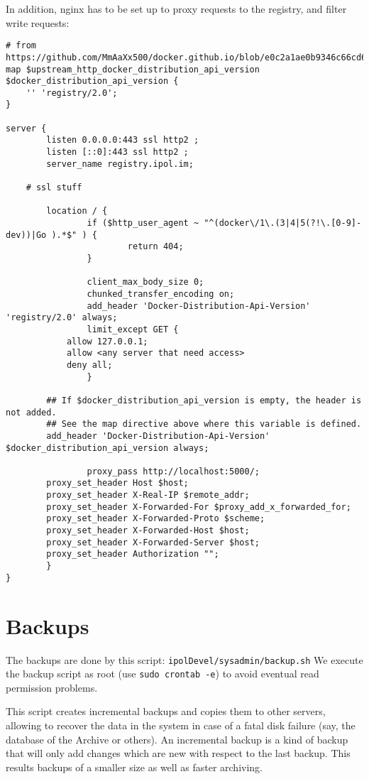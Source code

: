 \documentclass[a4paper,12pt]{article}
\begin{document}
In addition, nginx has to be set up to proxy requests to the registry, and filter write requests:

\begin{verbatim}
# from https://github.com/MmAaXx500/docker.github.io/blob/e0c2a1ae0b9346c66cd65d457cd67f130ff440cd/registry/recipes/nginx.md
map $upstream_http_docker_distribution_api_version $docker_distribution_api_version {
	'' 'registry/2.0';
}

server {
        listen 0.0.0.0:443 ssl http2 ;
        listen [::0]:443 ssl http2 ;
        server_name registry.ipol.im;

	# ssl stuff

        location / {
                if ($http_user_agent ~ "^(docker\/1\.(3|4|5(?!\.[0-9]-dev))|Go ).*$" ) {
                        return 404;
                }

                client_max_body_size 0;
                chunked_transfer_encoding on;
                add_header 'Docker-Distribution-Api-Version' 'registry/2.0' always;
                limit_except GET {
			allow 127.0.0.1;
			allow <any server that need access>
			deny all;
                }

		## If $docker_distribution_api_version is empty, the header is not added.
		## See the map directive above where this variable is defined.
		add_header 'Docker-Distribution-Api-Version' $docker_distribution_api_version always;

                proxy_pass http://localhost:5000/;
		proxy_set_header Host $host;
		proxy_set_header X-Real-IP $remote_addr;
		proxy_set_header X-Forwarded-For $proxy_add_x_forwarded_for;
		proxy_set_header X-Forwarded-Proto $scheme;
		proxy_set_header X-Forwarded-Host $host;
		proxy_set_header X-Forwarded-Server $host;
		proxy_set_header Authorization "";
        }
}
\end{verbatim}



\section{Backups}
\label{sec:backups}
The backups are done by this script: {\tt ipolDevel/sysadmin/backup.sh}
We execute the backup script as root (use {\tt sudo crontab -e}) to avoid eventual read permission problems.

This script creates incremental backups and copies them to other servers, allowing to recover the data in the system in case of a fatal disk failure (say, the database of the Archive or others). An incremental backup is a kind of backup that will only add changes which are new with respect to the last backup. This results backups of a smaller size as well as faster archiving.
\end{document}
